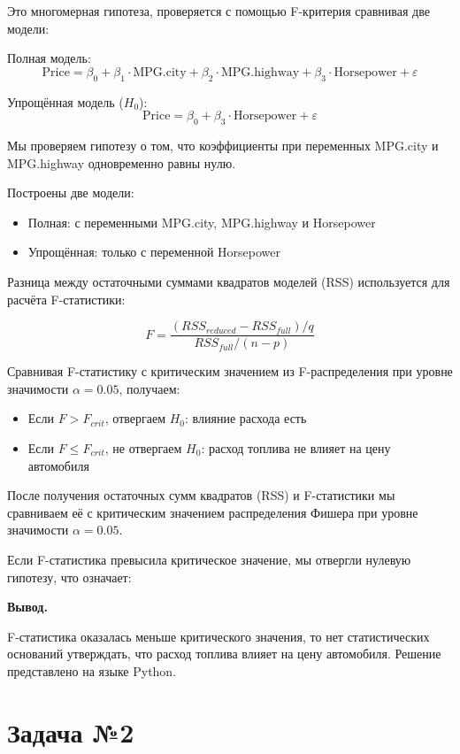 \documentclass[12pt]{article}
\begin{document}
	Это многомерная гипотеза, проверяется с помощью F-критерия сравнивая две модели:
	
	Полная модель: $$
	\text{Price} = \beta_0 + \beta_1 \cdot \text{MPG.city} + \beta_2 \cdot \text{MPG.highway} + \beta_3 \cdot \text{Horsepower} + \varepsilon
	$$
	
	Упрощённая модель ($H_0$): $$
	\text{Price} = \beta_0 + \beta_3 \cdot \text{Horsepower} + \varepsilon
	$$
	
	Мы проверяем гипотезу о том, что коэффициенты при переменных MPG.city и MPG.highway одновременно равны нулю.
	
	Построены две модели:
	\begin{itemize}
		\item Полная: с переменными MPG.city, MPG.highway и Horsepower
		
		\item Упрощённая: только с переменной Horsepower
	\end{itemize}
	
	Разница между остаточными суммами квадратов моделей (RSS) используется для расчёта F-статистики:
	
	$$ F = \frac{(RSS_{reduced} - RSS_{full}) / q}{RSS_{full} / (n - p)} $$
	
	Сравнивая F-статистику с критическим значением из F-распределения при уровне значимости $\alpha = 0.05$, получаем:
	
	\begin{itemize}
		\item Если $F > F_{crit}$, отвергаем $H_0$: влияние расхода есть
		
		\item Если $F \le F_{crit}$, не отвергаем $H_0$: расход топлива не влияет на цену автомобиля
	\end{itemize}
	
	После получения остаточных сумм квадратов (RSS) и F-статистики мы сравниваем её с критическим значением распределения Фишера при уровне значимости $\alpha = 0.05$.
	
	Если F-статистика превысила критическое значение, мы отвергли нулевую гипотезу, что означает:
	
	\textbf{Вывод.}
	
	F-статистика оказалась меньше критического значения, то нет статистических оснований утверждать, что расход топлива влияет на цену автомобиля. Решение представлено на языке Python.
	\newpage
	
	\section*{Задача №2}
	
\end{document}
